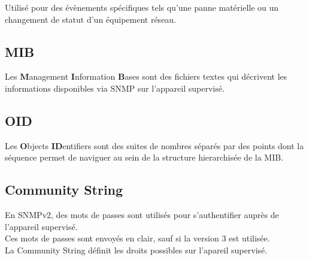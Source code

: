 \documentclass{report}
\begin{document}
			Utilisé pour des évènements spécifiques tels qu'une panne matérielle ou un changement de statut d'un équipement réseau.\\

		\subsection{MIB}

			Les \textbf{M}anagement \textbf{I}nformation \textbf{B}ases sont des fichiers textes qui décrivent les informations disponibles via SNMP sur l'appareil supervisé.\\

		\subsection{OID}

			Les \textbf{O}bjects \textbf{ID}entifiers sont des suites de nombres séparés par des points dont la séquence permet de naviguer au sein de la structure hierarchisée de la MIB.\\

		\subsection{Community String}

			En SNMPv2, des mots de passes sont utilisés pour s'authentifier auprès de l'appareil supervisé.\\

			Ces mots de passes sont envoyés en clair, sauf si la version 3 est utilisée.\\

			La Community String définit les droits possibles sur l'apareil supervisé.
 
\end{document}
